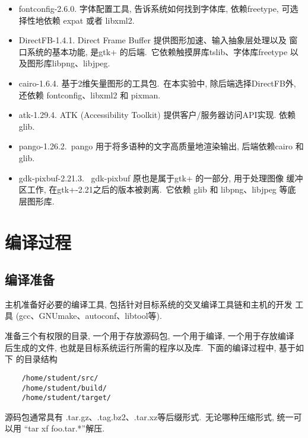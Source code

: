 \begin{itemize}
  \item fontconfig-2.6.0. 字体配置工具, 告诉系统如何找到字体库, 依赖freetype,
      可选择性地依赖 expat 或者 libxml2.

  \item DirectFB-1.4.1. Direct Frame Buffer 提供图形加速、输入抽象层处理以及
      窗口系统的基本功能, 是gtk+ 的后端.~它依赖触摸屏库tslib、字体库freetype
      以及图形库libpng、libjpeg.

  \item cairo-1.6.4. 基于2维矢量图形的工具包.~在本实验中, 除后端选择DirectFB外,
      还依赖 fontconfig、libxml2 和 pixman.
  \item atk-1.29.4. ATK (Accessibility Toolkit) 提供客户/服务器访问API实现.
      依赖 glib.

  \item pango-1.26.2.\ pango 用于将多语种的文字高质量地渲染输出, 后端依赖cairo
      和glib.

  \item gdk-pixbuf-2.21.3. \ gdk-pixbuf 原也是属于gtk+ 的一部分, 用于处理图像
      缓冲区工作, 在gtk+-2.21之后的版本被剥离.~它依赖 glib 和 libpng、libjpeg
      等底层图形库.
\end{itemize}

\section{编译过程}
\subsection{编译准备}
    主机准备好必要的编译工具, 包括针对目标系统的交叉编译工具链和主机的开发
工具 (gcc、GNUmake、autoconf、libtool等).

    准备三个有权限的目录, 一个用于存放源码包, 一个用于编译, 一个用于存放编译
后生成的文件, 也就是目标系统运行所需的程序以及库.~下面的编译过程中, 基于如下
的目录结构

\begin{verbatim}
    /home/student/src/
    /home/student/build/
    /home/student/target/
\end{verbatim}

    源码包通常具有 .tar.gz、.tag.bz2、.tar.xz等后缀形式.~无论哪种压缩形式,
统一可以用 ``tar xf foo.tar.*''解压.

